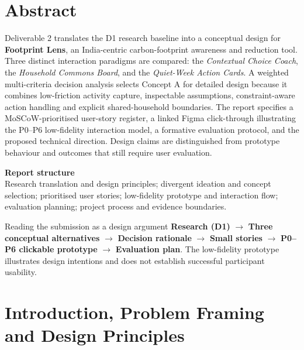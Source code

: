 \documentclass[12pt,a4paper]{article}
\begin{document}
\section*{Abstract}
Deliverable 2 translates the D1 research baseline into a conceptual design for \textbf{Footprint Lens}, an India-centric carbon-footprint awareness and reduction tool. Three distinct interaction paradigms are compared: the \emph{Contextual Choice Coach}, the \emph{Household Commons Board}, and the \emph{Quiet-Week Action Cards}. A weighted multi-criteria decision analysis selects Concept A for detailed design because it combines low-friction activity capture, inspectable assumptions, constraint-aware action handling and explicit shared-household boundaries. The report specifies a MoSCoW-prioritised user-story register, a linked Figma click-through illustrating the P0--P6 low-fidelity interaction model, a formative evaluation protocol, and the proposed technical direction. Design claims are distinguished from prototype behaviour and outcomes that still require user evaluation.

\vspace{0.4cm}
\begin{keybox}
\textbf{\sffamily\color{Navy}Report structure}\\
Research translation and design principles; divergent ideation and concept selection; prioritised user stories; low-fidelity prototype and interaction flow; evaluation planning; project process and evidence boundaries.
\end{keybox}

\begin{chapterfocus}{Reading the submission as a design argument}
\textbf{Research (D1)} $\rightarrow$ \textbf{Three conceptual alternatives} $\rightarrow$ \textbf{Decision rationale} $\rightarrow$ \textbf{Small stories} $\rightarrow$ \textbf{P0--P6 clickable prototype} $\rightarrow$ \textbf{Evaluation plan}. The low-fidelity prototype illustrates design intentions and does not establish successful participant usability.
\end{chapterfocus}

\clearpage
\tableofcontents
\clearpage
{}
\setcounter{page}{1}

\section{Introduction, Problem Framing and Design Principles}
\end{document}

